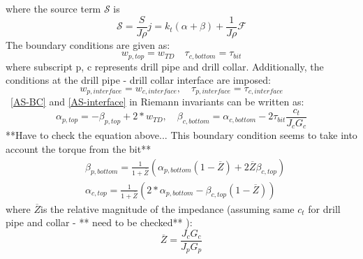 where the source term $\mathcal{S}$ is
\begin{equation}\label{AS-source}
  \mathcal{S} = \frac{S}{J \rho} j= k_t(\alpha + \beta) + \frac{1}{J \rho} \mathcal{F}
\end{equation}
The boundary conditions are given as:
\begin{equation}\label{AS-BC}
  w_{p,top} = w_{TD} \quad \tau_{c,bottom} = \tau_{bit}
\end{equation}
where subscript p, c represents drill pipe and drill collar.
Additionally, the conditions at the drill pipe - drill collar interface are imposed:
\begin{equation}\label{AS-interface}
  w_{p,interface} = w_{c,interface}, \quad \tau_{p,interface} = \tau_{c,interface}
\end{equation}
\equationname~\ref{AS-BC} and \ref{AS-interface} in Riemann invariants can be written as:
\begin{equation}\label{AS-riemannBC}
  \alpha_{p,top} = -\beta_{p,top} + 2*w_{TD}, \quad \beta_{c,bottom} = \alpha_{c,bottom} - 2\tau_{bit} \frac{c_t}{J_c G_c}
\end{equation}
**Have to check the equation above... This boundary condition seems to take into account the torque from the bit**
\begin{equation}\label{AS-riemanninterface}
\begin{split}
    & \beta_{p,bottom} = \frac{1}{1+\overline{Z}}\left(\alpha_{p,bottom}(1-\overline{Z}) + 2\overline{Z}\beta_{c,top} \right) \\
    & \alpha_{c,top} = \frac{1}{1+\overline{Z}}\left(2*\alpha_{p,bottom} - \beta_{c,top}(1-\overline{Z})\right)
\end{split}
\end{equation}
where $\overline{Z}$is the relative magnitude of the impedance (assuming same $c_t$ for drill pipe and collar - ** need to be checked** ):
\begin{equation}\label{AS_Zbar}
  \overline{Z} = \frac{J_c G_c}{J_p G_p}
\end{equation}

